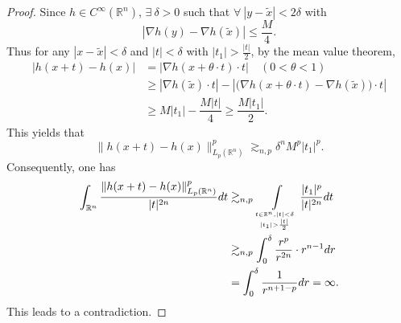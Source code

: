 \documentclass[oneside,english,a4wide]{amsart}
\numberwithin{equation}{section}
\numberwithin{figure}{section}
\theoremstyle{plain}
\theoremstyle{plain}
\theoremstyle{definition}
\theoremstyle{plain}
\theoremstyle{remark}
\theoremstyle{definition}
\theoremstyle{remark}
\theoremstyle{definition}
\newcommand{\8}{\infty}
\begin{document}
\begin{proof}
	Since $h\in C^\infty(\mathbb{R}^n)$, $\exists\ \delta>0$ such that $\forall \ |y-\tilde{x}|<2\delta$ with
	$$  |\nabla h(y)-\nabla h(\tilde{x})|\leq \dfrac{M}{4}.  $$
	Thus for any $ |x-\tilde{x}|<\delta$ and $|t|<\delta$ with $|t_1|>\frac{|t|}{2}$, by the mean value theorem,
	\begin{equation*}
		\begin{aligned}
			|h(x+t)-h(x)|&=|\nabla h(x+\theta\cdot t)\cdot t| \quad (0<\theta<1)\\
			&\geq |\nabla h(\tilde{x})\cdot t|-|\big(\nabla h(x+\theta\cdot t)-\nabla h(\tilde{x})\big)\cdot t|\\
			&\geq M|t_1|-\dfrac{M|t|}{4}\geq \dfrac{M|t_1|}{2}.
		\end{aligned}
	\end{equation*}
	This yields that
	\begin{equation}\label{phibb66}
		\|h(x+t)-h(x)\|^p_{L_p(\mathbb{R}^n)}\gtrsim _{n, p}\delta^n M^p |t_1|^p.
	\end{equation}
	Consequently, one has
	\begin{equation}\label{bbcont2n}
		\begin{aligned}
			\int_{\mathbb{R}^n}\frac{\|h(x+t)-h(x)\|^p_{L_p(\mathbb{R}^n)}}{|t|^{2n}}dt&\gtrsim_{n, p} \int\limits_{t\in \mathbb{R}^n, |t|<\delta \atop |t_1|>\frac{|t|}{2}} \dfrac{|t_1|^p}{|t|^{2n}}dt\\
			&\gtrsim_{n, p} \int_{0}^\delta \dfrac{r^p}{r^{2n}}\cdot r^{n-1} dr\\
			&= \int_{0}^\delta \dfrac{1}{r^{n+1-p}}dr=\8.
		\end{aligned}
	\end{equation}
	This leads to a contradiction.

\end{proof}
\end{document}
